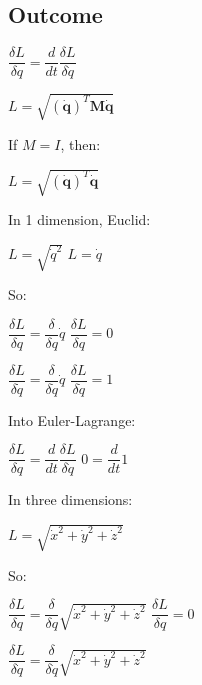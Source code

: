 
\subsection{Outcome}


\(\dfrac{\delta L}{\delta q}=\dfrac{d}{dt}\dfrac{\delta L}{\delta \dot q}\)


\(L=\sqrt {(\mathbf {\dot q})^T\mathbf M\mathbf {\dot q}}\)

If \(M=I\), then:

\(L=\sqrt {(\mathbf {\dot q})^T \mathbf {\dot q}}\)

In 1 dimension, Euclid:

\(L=\sqrt {\dot q^2}\)
\(L=\dot q\)


So:

\(\dfrac{\delta L}{\delta q}=\dfrac{\delta }{\delta q}\dot q\)
\(\dfrac{\delta L}{\delta q}=0\)

\(\dfrac{\delta L}{\delta \dot q}=\dfrac{\delta }{\delta \dot q}\dot q\)
\(\dfrac{\delta L}{\delta \dot q}=1\)

Into Euler-Lagrange:

\(\dfrac{\delta L}{\delta q}=\dfrac{d}{dt}\dfrac{\delta L}{\delta \dot q}\)
\(0=\dfrac{d}{dt}1\)


In three dimensions:

\(L=\sqrt {\dot x^2 + \dot y^2 + \dot z^2}\)

So:

\(\dfrac{\delta L}{\delta q}=\dfrac{\delta }{\delta q}\sqrt {\dot x^2 + \dot y^2 + \dot z^2}\)
\(\dfrac{\delta L}{\delta q}=0\)

\(\dfrac{\delta L}{\delta \dot q}=\dfrac{\delta }{\delta \dot q}\sqrt {\dot x^2 + \dot y^2 + \dot z^2}\)

